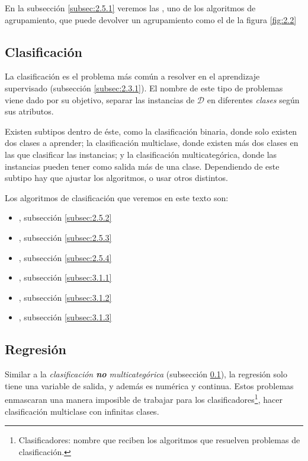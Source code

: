 En la subsección \ref{subsec:2.5.1} veremos las \emph{}, uno de los algoritmos de agrupamiento, que puede devolver un agrupamiento como el de la figura \ref{fig:2.2} 

\subsection{Clasificación} \label{subsec:2.4.2}

La clasificación es el problema más común a resolver en el aprendizaje supervisado (subsección \ref{subsec:2.3.1}). El nombre de este tipo de problemas viene dado por su objetivo, separar las instancias de $\mathcal{D}$ en diferentes \emph{clases} según sus atributos.

Existen subtipos dentro de éste, como la clasificación binaria, donde solo existen dos clases a aprender; la clasificación multiclase, donde existen más dos clases en las que clasificar las instancias; y la clasificación multicategórica, donde las instancias pueden tener como salida más de una clase. Dependiendo de este subtipo hay que ajustar los algoritmos, o usar otros distintos.

Los algoritmos de clasificación que veremos en este texto son:

\begin{itemize}
\item[\textbullet], subsección \ref{subsec:2.5.2}
\item[\textbullet], subsección \ref{subsec:2.5.3}
\item[\textbullet], subsección \ref{subsec:2.5.4}
\item[\textbullet], subsección \ref{subsec:3.1.1}
\item[\textbullet], subsección \ref{subsec:3.1.2}
\item[\textbullet], subsección \ref{subsec:3.1.3}
\end{itemize}

\subsection{Regresión} \label{subsec:2.4.3}

Similar a la \emph{clasificación \textbf{no} multicategórica} (subsección \ref{subsec:2.4.2}), la regresión solo tiene una variable de salida, y además es numérica y continua. Estos problemas enmascaran una manera imposible de trabajar para los clasificadores\footnote{Clasificadores: nombre que reciben los algoritmos que resuelven problemas de clasificación.}, hacer clasificación multiclase con infinitas clases.

